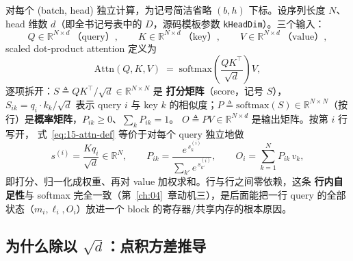 对每个 (batch, head) 独立计算，为记号简洁省略 $(b,h)$ 下标。设序列长度 $N$、head
维数 $d$（即全书记号表中的 $D$，源码模板参数 \texttt{kHeadDim}）。三个输入：
\begin{equation}
  Q \in \mathbb{R}^{N \times d}\ \text{（query）}, \qquad
  K \in \mathbb{R}^{N \times d}\ \text{（key）}, \qquad
  V \in \mathbb{R}^{N \times d}\ \text{（value）},
\end{equation}
scaled dot-product attention 定义为
\begin{equation}
  \mathrm{Attn}(Q,K,V) \;=\; \mathrm{softmax}\!\left(\frac{QK^{\top}}{\sqrt{d}}\right) V ,
  \label{eq:15-attn-def}
\end{equation}
逐项拆开：$S \triangleq QK^{\top}/\sqrt{d} \in \mathbb{R}^{N \times N}$ 是
\textbf{打分矩阵}（score，记号 $S$），$S_{ik} = q_i \cdot k_k / \sqrt{d}$ 表示
query $i$ 与 key $k$ 的相似度；$P \triangleq \mathrm{softmax}(S) \in \mathbb{R}^{N
\times N}$（按行）是\textbf{概率矩阵}，$P_{ik} \ge 0$、$\sum_{k} P_{ik} = 1$。
$O \triangleq PV \in \mathbb{R}^{N \times d}$ 是输出矩阵。按第 $i$ 行写开，
式~\ref{eq:15-attn-def} 等价于对每个 query 独立地做
\begin{equation}
  s^{(i)} = \frac{K q_i}{\sqrt{d}} \in \mathbb{R}^{N},
  \qquad
  P_{ik} = \frac{e^{\,s^{(i)}_k}}{\sum_{k'} e^{\,s^{(i)}_{k'}}},
  \qquad
  O_i = \sum_{k=1}^{N} P_{ik}\, v_k ,
  \label{eq:15-attn-rows}
\end{equation}
即打分、归一化成权重、再对 value 加权求和。行与行之间零依赖，这条
\textbf{行内自足性}与 softmax 完全一致（第~\ref{ch:04}~章动机三），是后面能把一行
query 的全部状态（$m_i, \ell_i, O_i$）放进一个 block 的寄存器/共享内存的根本原因。

\subsection{为什么除以 $\sqrt{d}$：点积方差推导}

